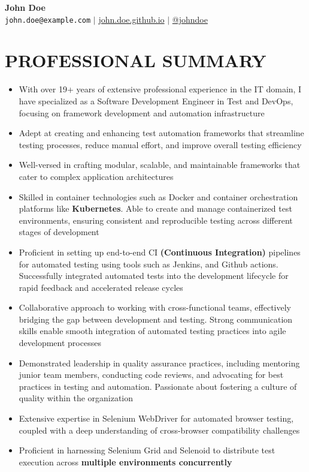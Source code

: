 \documentclass[letterpaper,11pt]{article}
\newcommand{\resumeItem}[1]{
  \item\small{
    {#1 \vspace{-1pt}}
  }
}
\begin{document}
\begin{center}
    \textbf{\Huge John Doe} \\ \vspace{5pt}
    \hspace{1pt} \faEnvelope \hspace{2pt} \texttt{john.doe@example.com} \hspace{1pt} $|$ 
    \hspace{1pt} \faGlobe \hspace{2pt} \href{http://john.doe.github.io/}{john.doe.github.io} \hspace{1pt} $|$
    \hspace{1pt} \faMedium \hspace{2pt} \href{https://medium.com/@johndoe}{@johndoe}
    \\ \vspace{-3pt}
\end{center}

\section{PROFESSIONAL SUMMARY}
\begin{itemize}[noitemsep,topsep=0pt]
    \resumeItem{With over 19+ years of extensive professional experience in the IT domain, I have specialized as a Software Development Engineer in Test and DevOps, focusing on framework development and automation infrastructure}
    \resumeItem{Adept at creating and enhancing test automation frameworks that streamline testing processes, reduce manual effort, and improve overall testing efficiency}
    \resumeItem{Well-versed in crafting modular, scalable, and maintainable frameworks that cater to complex application architectures}
    \resumeItem{Skilled in container technologies such as Docker and container orchestration platforms like \textbf{Kubernetes}. Able to create and manage containerized test environments, ensuring consistent and reproducible testing across different stages of development}
    \resumeItem{Proficient in setting up end-to-end CI \textbf{(Continuous Integration)} pipelines for automated testing using tools such as Jenkins, and Github actions. Successfully integrated automated tests into the development lifecycle for rapid feedback and accelerated release cycles}
    \resumeItem{Collaborative approach to working with cross-functional teams, effectively bridging the gap between development and testing. Strong communication skills enable smooth integration of automated testing practices into agile development processes}
    \resumeItem{Demonstrated leadership in quality assurance practices, including mentoring junior team members, conducting code reviews, and advocating for best practices in testing and automation. Passionate about fostering a culture of quality within the organization}
    \resumeItem{Extensive expertise in Selenium WebDriver for automated browser testing, coupled with a deep understanding of cross-browser compatibility challenges}
    \resumeItem{Proficient in harnessing Selenium Grid and Selenoid to distribute test execution across \textbf{multiple environments concurrently}}
\end{itemize}
\end{document}
